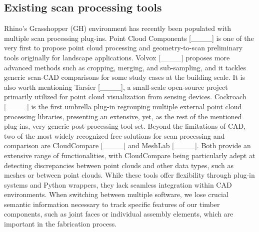 \subsection{Existing scan processing tools}
\label{sec:rel:timber_eval}
Rhino's Grasshopper (GH) environment has recently been populated with multiple scan processing plug-ins. Point Cloud Components [____] is one of the very first to propose point cloud processing and geometry-to-scan preliminary tools originally for landscape applications. Volvox [____] proposes more advanced methods such as cropping, merging, and sub-sampling, and it tackles generic scan-CAD comparisons for some study cases at the building scale. It is also worth mentioning Tarsier [____], a small-scale open-source project primarily utilized for point cloud visualization from sensing devices. Cockroach [____] is the first umbrella plug-in regrouping multiple external point cloud processing libraries, presenting an extensive, yet, as the rest of the mentioned plug-ins, very generic post-processing tool-set.
Beyond the limitations of CAD, two of the most widely recognized free solutions for scan processing and comparison are CloudCompare [____] and MeshLab [____]. Both provide an extensive range of functionalities, with CloudCompare being particularly adept at detecting discrepancies between point clouds and other data types, such as meshes or between point clouds. While these tools offer flexibility through plug-in systems and Python wrappers, they lack seamless integration within CAD environments. When switching between multiple software, we lose crucial semantic information necessary to track specific features of our timber components, such as joint faces or individual assembly elements, which are important in the fabrication process.


